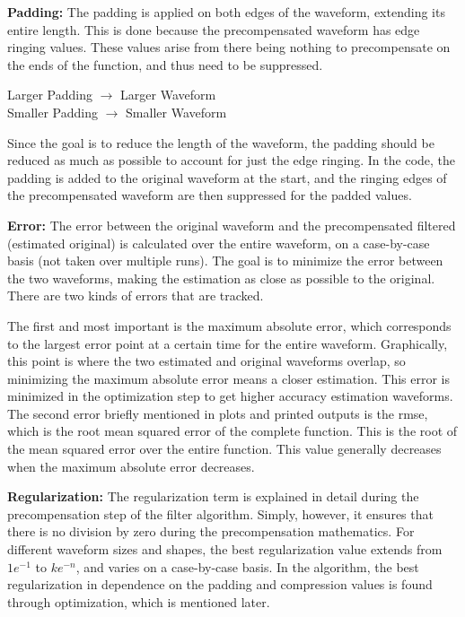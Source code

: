 \begin{definition}
     \textbf{Padding:} The padding is applied on both edges of the waveform, extending its entire length. This is done because the precompensated waveform has edge ringing values. These values arise from there being nothing to precompensate on the ends of the function, and thus need to be suppressed. 
    \begin{center}
        Larger Padding $\rightarrow$ Larger Waveform \\
        Smaller Padding $\rightarrow$ Smaller Waveform
    \end{center}
\end{definition}
Since the goal is to reduce the length of the waveform, the padding should be reduced as much as possible to account for just the edge ringing. In the code, the padding is added to the original waveform at the start, and the ringing edges of the precompensated waveform are then suppressed for the padded values.

\begin{definition}
     \textbf{Error:} The error between the original waveform and the precompensated filtered (estimated original) is calculated over the entire waveform, on a case-by-case basis (not taken over multiple runs). The goal is to minimize the error between the two waveforms, making the estimation as close as possible to the original. There are two kinds of errors that are tracked. 
     
     The first and most important is the maximum absolute error, which corresponds to the largest error point at a certain time for the entire waveform. Graphically, this point is where the two estimated and original waveforms overlap, so minimizing the maximum absolute error means a closer estimation. This error is minimized in the optimization step to get higher accuracy estimation waveforms.
\\
     The second error briefly mentioned in plots and printed outputs is the rmse, which is the root mean squared error of the complete function. This is the root of the mean squared error over the entire function. This value generally decreases when the maximum absolute error decreases.
\end{definition}

\begin{definition}
    \textbf{Regularization:} The regularization term is explained in detail during the precompensation step of the filter algorithm. Simply, however, it ensures that there is no division by zero during the precompensation mathematics. For different waveform sizes and shapes, the best regularization value extends from $1e^{-1}$ to $ke^{-n}$, and varies on a case-by-case basis. In the algorithm, the best regularization in dependence on the padding and compression values is found through optimization, which is mentioned later.
\end{definition}


